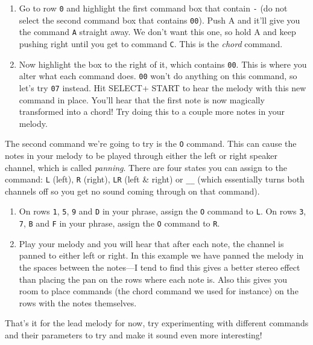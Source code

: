 \documentclass[]{article}
\newcommand{\buttonStyle}[1]{\textsf{#1}\xspace}
\newcommand{\bA}{\buttonStyle{A}}
\newcommand{\bStart}{\buttonStyle{{START}}}
\newcommand{\bSelect}{\buttonStyle{{SELECT}}}
\newcommand{\gbtxt}[1]{\texttt{#1}\xspace}
\begin{document}
\begin{enumerate}
	
\item Go to row \gbtxt{0} and highlight the first command box that contain \gbtxt{-} (do not select the second command box that contains \gbtxt{00}). Push \bA and it'll give you the command \gbtxt{A} straight away. We don't want this one, so hold \bA and keep pushing right until you get to command \gbtxt{C}. This is the \textit{chord} command.

\item Now highlight the box to the right of it, which contains \gbtxt{00}. This is where you alter what each command does. \gbtxt{00} won't do anything on this command, so let's try \gbtxt{07} instead. Hit \bSelect + \bStart to hear the melody with this new command in place. You'll hear that the first note is now magically transformed into a chord! Try doing this to a couple more notes in your melody.

\end{enumerate}

The second command we're going to try is the \gbtxt{O} command. This can cause the notes in your melody to be played through either the left or right speaker channel, which is called \textit{panning}. There are four states you can assign to the command: \gbtxt{L} (left), \gbtxt{R} (right), \gbtxt{LR} (left \& right) or \gbtxt{\_\_} (which essentially turns both channels off so you get no sound coming through on that command).

\begin{enumerate}[resume]
	
\item  On rows \gbtxt{1}, \gbtxt{5}, \gbtxt{9} and \gbtxt{D} in your phrase, assign the \gbtxt{O} command to \gbtxt{L}. On rows \gbtxt{3}, \gbtxt{7}, \gbtxt{B} and \gbtxt{F} in your phrase, assign the \gbtxt{O} command to \gbtxt{R}.

\item Play your melody and you will hear that after each note, the channel is panned to either left or right. In this example we have panned the melody in the spaces between the notes---I tend to find this gives a better stereo effect than placing the pan on the rows where each note is. Also this gives you room to place commands (the chord command we used for instance) on the rows with the notes themselves.

\end{enumerate}

That's it for the lead melody for now, try experimenting with different commands and their parameters to try and make it sound even more interesting!
\end{document}
